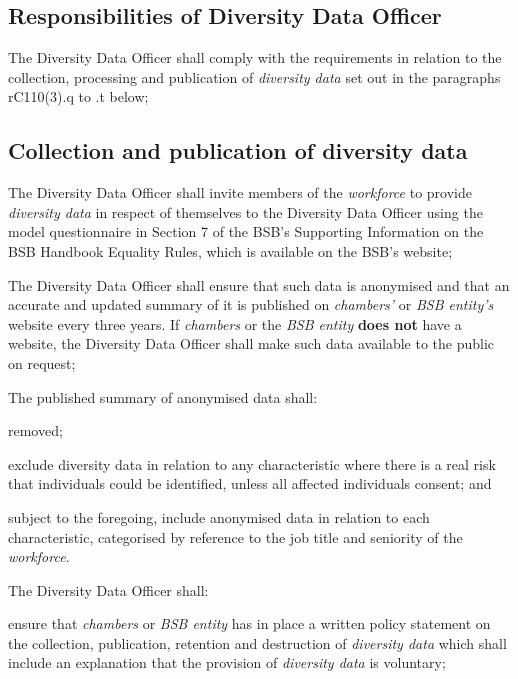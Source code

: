 \begin{numlist}
\begin{alphlist}
\subsection{Responsibilities of Diversity Data Officer}

\item The Diversity Data Officer shall comply with the requirements in
relation to the collection, processing and publication of
\emph{diversity data} set out in the paragraphs rC110(3).q to .t below;

\subsection{Collection and publication of diversity data}

\item The Diversity Data Officer shall invite members of the
\emph{workforce} to provide \emph{diversity data} in respect of
themselves to the Diversity Data Officer using the model questionnaire
in Section 7 of the BSB's Supporting Information on the BSB Handbook
Equality Rules, which is available on the BSB's website;

\item The Diversity Data Officer shall ensure that such data is anonymised
and that an accurate and updated summary of it is published on
\emph{chambers'} or \emph{BSB entity's} website every three years. If
\emph{chambers} or the \emph{BSB entity} \textcolor{myred}{\textbf{does not}} have a website, the
Diversity Data Officer shall make such data available to the public on
request;

\item The published summary of anonymised data shall:
\begin{romlist}
\item removed;

\item exclude diversity data in relation to any characteristic where there
is a real risk that individuals could be identified, unless all affected
individuals consent; and

\item subject to the foregoing, include anonymised data in relation to
each characteristic, categorised by reference to the job title and
seniority of the \emph{workforce}.\end{romlist}

\item The Diversity Data Officer shall:

\begin{romlist}\item ensure that \emph{chambers} or \emph{BSB entity} has in place a
written policy statement on the collection, publication, retention and
destruction of \emph{diversity data} which shall include an explanation
that the provision of \emph{diversity data} is voluntary;


\end{romlist}
\end{alphlist}
\end{numlist}
